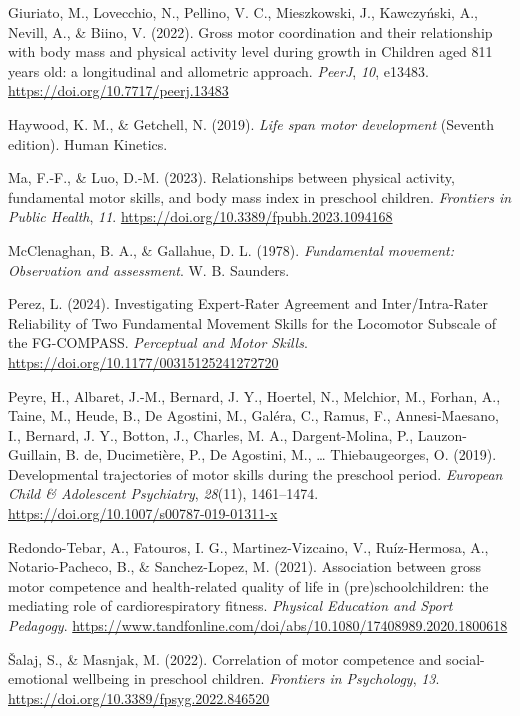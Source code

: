 \documentclass[
  letterpaper,
  DIV=11,
  numbers=noendperiod]{scrreprt}
\newlength{\cslhangindent}
\newenvironment{CSLReferences}[2] %
 {\begin{list}{}{%
  \setlength{\itemindent}{0pt}
  \setlength{\leftmargin}{0pt}
  \setlength{\parsep}{0pt}
  \ifodd #1
   \setlength{\leftmargin}{\cslhangindent}
   \setlength{\itemindent}{-1\cslhangindent}
  \fi
  \setlength{\itemsep}{#2\baselineskip}}}
 {\end{list}}
\begin{document}
\begin{CSLReferences}{1}{0}
Giuriato, M., Lovecchio, N., Pellino, V. C., Mieszkowski, J.,
Kawczyński, A., Nevill, A., \& Biino, V. (2022). Gross motor
coordination and their relationship with body mass and physical activity
level during growth in Children aged 8{\textendash}11 years old: a
longitudinal and allometric approach. \emph{PeerJ}, \emph{10}, e13483.
\url{https://doi.org/10.7717/peerj.13483}

Haywood, K. M., \& Getchell, N. (2019). \emph{Life span motor
development} (Seventh edition). Human Kinetics.

Ma, F.-F., \& Luo, D.-M. (2023). Relationships between physical
activity, fundamental motor skills, and body mass index in preschool
children. \emph{Frontiers in Public Health}, \emph{11}.
\url{https://doi.org/10.3389/fpubh.2023.1094168}

McClenaghan, B. A., \& Gallahue, D. L. (1978). \emph{Fundamental
movement: Observation and assessment}. W. B. Saunders.

Perez, L. (2024). Investigating Expert-Rater Agreement and
Inter/Intra-Rater Reliability of Two Fundamental Movement Skills for the
Locomotor Subscale of the FG-COMPASS. \emph{Perceptual and Motor
Skills}. \url{https://doi.org/10.1177/00315125241272720}

Peyre, H., Albaret, J.-M., Bernard, J. Y., Hoertel, N., Melchior, M.,
Forhan, A., Taine, M., Heude, B., De Agostini, M., Galéra, C., Ramus,
F., Annesi-Maesano, I., Bernard, J. Y., Botton, J., Charles, M. A.,
Dargent-Molina, P., Lauzon-Guillain, B. de, Ducimetière, P., De
Agostini, M., \ldots{} Thiebaugeorges, O. (2019). Developmental
trajectories of motor skills during the preschool period. \emph{European
Child \& Adolescent Psychiatry}, \emph{28}(11), 1461--1474.
\url{https://doi.org/10.1007/s00787-019-01311-x}

Redondo-Tebar, A., Fatouros, I. G., Martinez-Vizcaino, V., Ruíz-Hermosa,
A., Notario-Pacheco, B., \& Sanchez-Lopez, M. (2021). Association
between gross motor competence and health-related quality of life in
(pre)schoolchildren: the mediating role of cardiorespiratory fitness.
\emph{Physical Education and Sport Pedagogy}.
\url{https://www.tandfonline.com/doi/abs/10.1080/17408989.2020.1800618}

Šalaj, S., \& Masnjak, M. (2022). Correlation of motor competence and
social-emotional wellbeing in preschool children. \emph{Frontiers in
Psychology}, \emph{13}. \url{https://doi.org/10.3389/fpsyg.2022.846520}


\end{CSLReferences}
\end{document}
